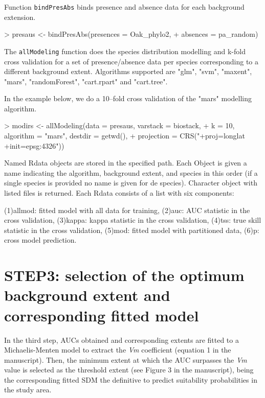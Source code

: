 \documentclass[10pt,a4paper]{report}
\begin{document}
Function \texttt{bindPresAbs} binds presence and absence data for each background extension.

\begin{Schunk}
\begin{Sinput}
> presaus <- bindPresAbs(presences = Oak_phylo2, 
+                        absences = pa_random)
\end{Sinput}
\end{Schunk}


The \texttt{allModeling} function does the species distribution modelling and k-fold cross validation for a set of presence/absence data per species corresponding to a different background 
extent. Algorithms supported are "glm", "svm", "maxent", "mars", "randomForest", "cart.rpart" 
and "cart.tree".

In the example below, we do a 10--fold cross validation of the "mars" modelling algorithm.

\begin{Schunk}
\begin{Sinput}
> modirs <- allModeling(data = presaus, varstack = biostack, 
+             k = 10, algorithm = "mars", destdir = getwd(), 
+             projection = CRS("+proj=longlat +init=epsg:4326"))
\end{Sinput}
\end{Schunk}

Named Rdata objects are stored in the specified path. Each Object is given a name indicating the algorithm, background extent, and species in this order (if a single species is provided no name is given for de species). Character object with listed files is returned. Each Rdata consists of a list with six components:

	(1)allmod: fitted model with all data for training, 
	(2)auc: AUC statistic in the cross validation,
	(3)kappa: kappa statistic in the cross validation,
	(4)tss: true skill statistic in the cross validation,
	(5)mod: fitted model with partitioned data, 
	(6)p: cross model prediction. 

\section{STEP3: selection of the optimum background extent and corresponding fitted model}

In the third step, AUCs obtained and corresponding extents are fitted to a Michaelis-Menten model to extract the \textit{Vm} coefficient (equation 1 in the manuscript). Then, the minimum extent at which the AUC surpasses the \textit{Vm} value is selected as the threshold extent (see Figure 3 in the manuscript), being the corresponding fitted SDM the definitive to predict suitability probabilities in the study area.
\end{document}
